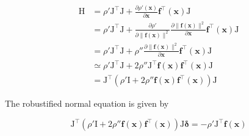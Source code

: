 \begin{equation}
\begin{aligned}
    \mathrm{H}
           &=
              \rho' \mathrm{J}^\top \mathrm{J} +
              \frac{\partial\rho'(\bm{x})}{\partial\bm{x}}
              \mathbf{f}^\top(\bm{x})\mathrm{J} \\
           &=
              \rho' \mathrm{J}^\top \mathrm{J} +
              \frac{\partial\rho'}{\partial\lVert\mathbf{f}(\bm{x})\rVert^2}
              \frac{\partial\lVert\mathbf{f}(\bm{x})\rVert^2}{\partial\bm{x}}
              \mathbf{f}^\top(\bm{x}) \mathrm{J} \\
           &=
              \rho' \mathrm{J}^\top \mathrm{J} + \rho''
              \frac{\partial\lVert\mathbf{f}(\bm{x})\rVert^2}{\partial\bm{x}}
              \mathbf{f}^\top(\bm{x}) \mathrm{J} \\
           &\simeq
              \rho' \mathrm{J}^\top \mathrm{J} + 2\rho''
              \mathrm{J}^\top \mathbf{f}(\bm{x}) \mathbf{f}^\top(\bm{x}) \mathrm{J} \\
           &=
              \mathrm{J}^\top \left(
                  \rho'\mathrm{I} + 2\rho''
                  \mathbf{f}(\bm{x}) \mathbf{f}^\top(\bm{x})
              \right) \mathrm{J}
\end{aligned}
\end{equation}

The robustified normal equation is given by

\begin{equation}
    \mathrm{J}^\top \left(
        \rho'\mathrm{I} + 2\rho''
        \mathbf{f}(\bm{x}) \mathbf{f}^\top(\bm{x})
    \right) \mathrm{J} \bm{\delta}
    =
    -\rho' \mathrm{J}^\top \mathbf{f}(\bm{x})
\end{equation}
